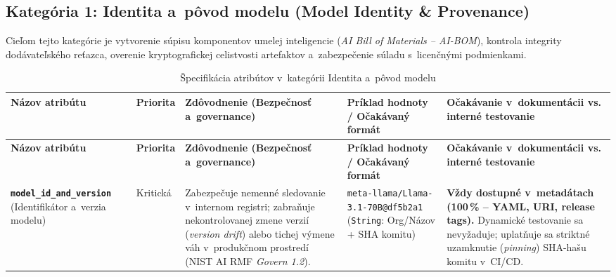 \subsection{Kategória 1: Identita a~pôvod modelu (Model Identity \& Provenance)}
\label{sec:kat-identita}

Cieľom tejto kategórie je vytvorenie súpisu komponentov umelej inteligencie
(\emph{AI Bill of Materials -- AI-BOM}), kontrola integrity dodávateľského
reťazca, overenie kryptografickej celistvosti artefaktov a~zabezpečenie súladu
s~licenčnými podmienkami.

{\footnotesize{}
\setlength{\tabcolsep}{4pt}
\begin{xltabular}{\textwidth}{@{}>{\raggedright\arraybackslash}p{2.6cm}>{\raggedright\arraybackslash}p{1.5cm}>{\raggedright\arraybackslash}X>{\raggedright\arraybackslash}p{3.1cm}>{\raggedright\arraybackslash}X@{}}
\caption{Špecifikácia atribútov v~kategórii Identita a~pôvod modelu}
\label{tab:kat-identita} \\
\toprule
\textbf{Názov atribútu} & \textbf{Priorita} & \textbf{Zdôvodnenie (Bezpečnosť a~governance)} & \textbf{Príklad hodnoty / Očakávaný formát} & \textbf{Očakávanie v~dokumentácii vs. interné testovanie} \\
\midrule
\endfirsthead
\toprule
\textbf{Názov atribútu} & \textbf{Priorita} & \textbf{Zdôvodnenie (Bezpečnosť a~governance)} & \textbf{Príklad hodnoty / Očakávaný formát} & \textbf{Očakávanie v~dokumentácii vs. interné testovanie} \\
\midrule
\endhead
\bottomrule
\endfoot

\textbf{\texttt{model\_\allowbreak id\_\allowbreak and\_\allowbreak version}} \newline (Identifikátor a~verzia modelu) &
Kritická &
Zabezpečuje nemenné sledovanie v~internom registri; zabraňuje nekontrolovanej zmene verzií (\emph{version drift}) alebo tichej výmene váh v~produkčnom prostredí (NIST AI RMF \emph{Govern 1.2}). &
\texttt{meta-llama/\allowbreak Llama-3.1-70B\allowbreak @df5b2a1} \newline (\texttt{String}: Org/Názov + SHA komitu) &
\textbf{Vždy dostupné v~metadátach (100\,\% -- YAML, URI, release tags).} Dynamické testovanie sa nevyžaduje; uplatňuje sa striktné uzamknutie (\emph{pinning}) SHA-hašu komitu v~CI/CD. \\
\midrule


\end{xltabular}}
